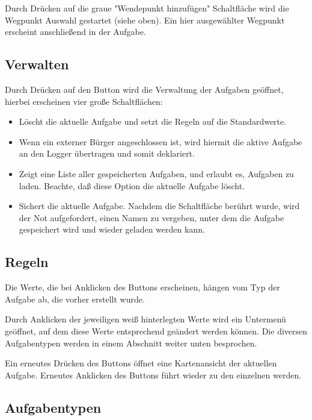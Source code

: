 Durch Drücken auf die graue "Wendepunkt hinzufügen" Schaltfläche wird die Wegpunkt Auswahl gestartet (siehe
oben).  Ein hier ausgewählter Wegpunkt erscheint anschließend in der Aufgabe.

\subsection*{Verwalten}
Durch Drücken auf den Button  wird die Verwaltung der Aufgaben geöffnet, hierbei erscheinen vier große Schaltflächen:

\begin{itemize}
\item {} Löscht die aktuelle Aufgabe und setzt die Regeln auf die Standardwerte.
\item {} Wenn ein externer Bürger angeschlossen ist, wird hiermit die aktive Aufgabe an den Logger übertragen und somit deklariert.
\item {} Zeigt eine Liste aller gespeicherten Aufgaben, und erlaubt es, Aufgaben zu laden. Beachte, daß diese Option die aktuelle Aufgabe löscht.
\item {} Sichert die aktuelle Aufgabe. Nachdem die Schaltfläche berührt wurde, wird der Not aufgefordert, einen Namen zu vergeben, unter dem die Aufgabe gespeichert wird und wieder geladen werden kann.
\end{itemize}

\subsection*{Regeln}
Die Werte, die bei Anklicken des Buttons  erscheinen, hängen vom Typ der Aufgabe ab, die vorher erstellt wurde.

Durch Anklicken der jeweiligen weiß hinterlegten Werte wird ein Untermenü geöffnet, auf dem diese Werte entsprechend geändert werden können. Die diversen Aufgabentypen werden in einem Abschnitt weiter unten besprochen.

Ein erneutes Drücken des Buttons   öffnet eine Kartenansicht der aktuellen Aufgabe. Erneutes Anklicken des Buttons führt wieder zu den einzelnen werden.

\subsection*{Aufgabentypen}

